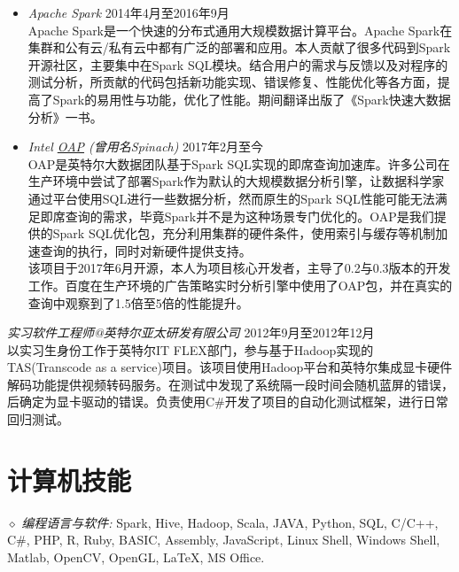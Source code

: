 \documentclass[line,margin]{res}
\begin{document}
\begin{resume}
\begin{itemize}
            \item{\sl Apache Spark} \hfill        2014年4月至2016年9月 \\
                Apache Spark是一个快速的分布式通用大规模数据计算平台。Apache Spark在集群和公有云/私有云中都有广泛的部署和应用。本人贡献了很多代码到Spark开源社区，主要集中在Spark SQL模块。结合用户的需求与反馈以及对程序的测试分析，所贡献的代码包括新功能实现、错误修复、性能优化等各方面，提高了Spark的易用性与功能，优化了性能。期间翻译出版了《Spark快速大数据分析》一书。\\
                   
             \item{\sl Intel \href{https://github.com/Intel-bigdata/OAP}{OAP} (曾用名Spinach)} \hfill        2017年2月至今\\
                OAP是英特尔大数据团队基于Spark SQL实现的即席查询加速库。许多公司在生产环境中尝试了部署Spark作为默认的大规模数据分析引擎，让数据科学家通过平台使用SQL进行一些数据分析，然而原生的Spark SQL性能可能无法满足即席查询的需求，毕竟Spark并不是为这种场景专门优化的。OAP是我们提供的Spark SQL优化包，充分利用集群的硬件条件，使用索引与缓存等机制加速查询的执行，同时对新硬件提供支持。\\
                该项目于2017年6月开源，本人为项目核心开发者，主导了0.2与0.3版本的开发工作。百度在生产环境的广告策略实时分析引擎中使用了OAP包，并在真实的查询中观察到了1.5倍至5倍的性能提升。\\

        \end{itemize}

      {\sl 实习软件工程师@英特尔亚太研发有限公司} \hfill         2012年9月至2012年12月\\
             以实习生身份工作于英特尔IT FLEX部门，参与基于Hadoop实现的TAS(Transcode as a service)项目。该项目使用Hadoop平台和英特尔集成显卡硬件解码功能提供视频转码服务。在测试中发现了系统隔一段时间会随机蓝屏的错误，后确定为显卡驱动的错误。负责使用C\#开发了项目的自动化测试框架，进行日常回归测试。

\section{计算机技能} {$\diamond$ \sl 编程语言与软件:} Spark, Hive, Hadoop, Scala, JAVA, Python, SQL, C/C++, C\#, PHP, R, Ruby, BASIC, Assembly, JavaScript, Linux Shell, Windows Shell, Matlab, OpenCV, OpenGL, \LaTeX, MS Office. \\


\end{resume}
\end{document}
